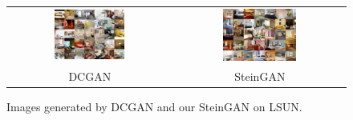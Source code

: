 \begin{figure}[t]
\centering
\begin{tabular}{cc}
\includegraphics[width=0.45\textwidth]{figures/lsun/dcgan_5_7.pdf} & 
\includegraphics[width=0.45\textwidth]{figures/lsun/vgd_5_7.pdf} \\
DCGAN & SteinGAN\\
\end{tabular}
\caption{Images generated by DCGAN and our SteinGAN on LSUN.}
\label{fig:room}
\end{figure}

